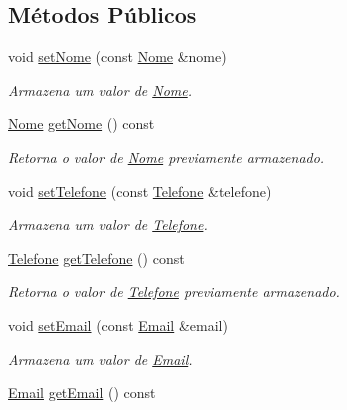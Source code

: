\subsection*{Métodos Públicos}
\begin{DoxyCompactItemize}
\item 
void \hyperlink{classshibarides_1_1Usuario_a605b73d80deba51209b16c15e7b93bd2}{set\+Nome} (const \hyperlink{classshibarides_1_1Nome}{Nome} \&nome)
\begin{DoxyCompactList}\small\item\em Armazena um valor de \hyperlink{classshibarides_1_1Nome}{Nome}. \end{DoxyCompactList}\item 
\hyperlink{classshibarides_1_1Nome}{Nome} \hyperlink{classshibarides_1_1Usuario_ab85327f5d8942aca054561c6716e9d18}{get\+Nome} () const 
\begin{DoxyCompactList}\small\item\em Retorna o valor de \hyperlink{classshibarides_1_1Nome}{Nome} previamente armazenado. \end{DoxyCompactList}\item 
void \hyperlink{classshibarides_1_1Usuario_a2be45f53adbb82577dbe5821d767baed}{set\+Telefone} (const \hyperlink{classshibarides_1_1Telefone}{Telefone} \&telefone)
\begin{DoxyCompactList}\small\item\em Armazena um valor de \hyperlink{classshibarides_1_1Telefone}{Telefone}. \end{DoxyCompactList}\item 
\hyperlink{classshibarides_1_1Telefone}{Telefone} \hyperlink{classshibarides_1_1Usuario_ad8658cd8fbe83ec38321849a88a48489}{get\+Telefone} () const 
\begin{DoxyCompactList}\small\item\em Retorna o valor de \hyperlink{classshibarides_1_1Telefone}{Telefone} previamente armazenado. \end{DoxyCompactList}\item 
void \hyperlink{classshibarides_1_1Usuario_a754f27880c0ce24072844655487554e5}{set\+Email} (const \hyperlink{classshibarides_1_1Email}{Email} \&email)
\begin{DoxyCompactList}\small\item\em Armazena um valor de \hyperlink{classshibarides_1_1Email}{Email}. \end{DoxyCompactList}\item 
\hyperlink{classshibarides_1_1Email}{Email} \hyperlink{classshibarides_1_1Usuario_ac78cb31456c8962980dcb5089bf60bee}{get\+Email} () const 

\end{DoxyCompactItemize}

